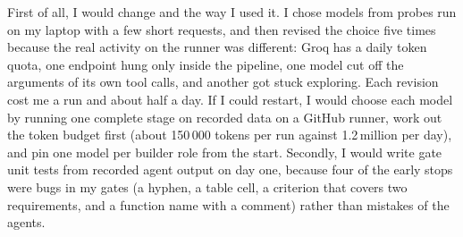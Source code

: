 First of all, I would change  and the way I used it. I chose models from probes run on my laptop with a few short requests, and then revised the choice five times because the real activity on the runner was different: Groq has a daily token quota, one endpoint hung only inside the pipeline, one model cut off the arguments of its own tool calls, and another got stuck exploring. Each revision cost me a run and about half a day. If I could restart, I would choose each model by running one complete stage on recorded data on a GitHub runner, work out the token budget first (about 150\,000 tokens per run against 1.2\,million per day), and pin one model per builder role from the start. Secondly, I would write gate unit tests from recorded agent output on day one, because four of the early stops were bugs in my gates (a hyphen, a table cell, a criterion that covers two requirements, and a function name with a comment) rather than mistakes of the agents.
